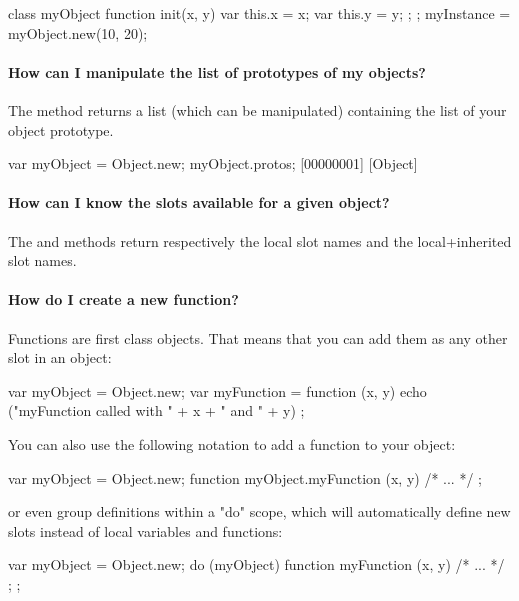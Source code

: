 \begin{urbifixme}
class myObject {
  function init(x, y) {
    var this.x = x;
    var this.y = y;
  };
};
myInstance = myObject.new(10, 20);
\end{urbifixme}


\paragraph{How can I manipulate the list of prototypes of my objects?}
The  method returns a list (which can be manipulated)
containing the list of your object prototype.

\begin{urbifixme}
var myObject = Object.new;
myObject.protos;
[00000001] [Object]
\end{urbifixme}

\paragraph{How can I know the slots available for a given object?}
The  and  methods return
respectively the local slot names and the local+inherited slot names.

\paragraph{How do I create a new function?}
Functions are first class objects. That means that you can add them as
any other slot in an object:

\begin{urbifixme}
var myObject = Object.new;
var myFunction = function (x, y)
  { echo ("myFunction called with " + x + " and " + y) };
\end{urbifixme}

You can also use the following notation to add a function to your
object:

\begin{urbifixme}
var myObject = Object.new;
function myObject.myFunction (x, y) { /* ... */ };
\end{urbifixme}

or even group definitions within a "do" scope, which will automatically
define new slots instead of local variables and functions:

\begin{urbifixme}
var myObject = Object.new;
do (myObject) {
  function myFunction (x, y) { /* ... */ };
};
\end{urbifixme}

